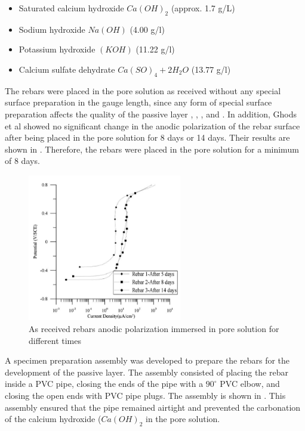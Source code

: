 \begin{itemize}
	\item Saturated calcium hydroxide $Ca(OH)_2$ (approx. 1.7 g/L)
	\item Sodium hydroxide $Na(OH)$ (4.00 g/l)
	\item Potassium hydroxide $(KOH)$ (11.22 g/l)
	\item Calcium sulfate dehydrate $Ca(SO)_4 + 2H_2O$ (13.77 g/l)
\end{itemize}

The rebars were placed in the pore solution as received without any special surface preparation in the gauge length, since any  form of special surface preparation affects the quality of  the passive layer \cite{Andersson1989}, \cite{DawnMarcotte2001}, \cite{Moragues1987}, and \cite{Page1983}. In addition, Ghods et al showed no significant change in the anodic polarization of the rebar surface after being placed in the pore solution for 8 days or 14 days. Their results are shown in . Therefore, the rebars were placed in the pore solution for a minimum of 8 days. 

\begin{figure}[htbp]
	\centering
	\includegraphics[width=0.6\textwidth]{Chapter-3/figs/AsReceived_AnodicPolarization_time}
	\caption{As received rebars anodic polarization immersed in pore solution for different times\cite{Ghods2009}}
	\label{fig:GhodsRebarPassivation}
\end{figure}

A specimen preparation assembly was developed to prepare the rebars for the development of the passive layer. The assembly consisted of placing the rebar inside a PVC pipe, closing the ends of the pipe with a $90^{\circ}$ PVC elbow, and closing the open ends with PVC pipe plugs. The assembly is shown in . This assembly ensured that the pipe remained airtight and prevented the carbonation of the calcium hydroxide ($Ca(OH)_{2}$ in the pore solution.

